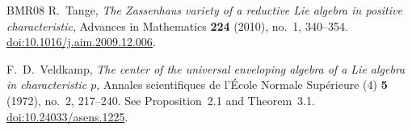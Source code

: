 \documentclass[twoside,a4paper,12pt,reqno]{amsart}
\theoremstyle{remark}
\numberwithin{equation}{section}
\begin{document}
\begin{thebibliography}{BMR08}
R.~Tange,
\emph{The Zassenhaus variety of a reductive Lie algebra in positive characteristic},
Advances in Mathematics \textbf{224} (2010), no.~1, 340--354.
\href{https://doi.org/10.1016/j.aim.2009.12.006}{doi:10.1016/j.aim.2009.12.006}.

F.~D.~Veldkamp,
\emph{The center of the universal enveloping algebra of a Lie algebra in characteristic \(p\)},
Annales scientifiques de l'\'Ecole Normale Sup\'erieure (4)
\textbf{5} (1972), no.~2, 217--240.
See Proposition~2.1 and Theorem~3.1.
\href{https://doi.org/10.24033/asens.1225}{doi:10.24033/asens.1225}.

\end{thebibliography}
\end{document}
